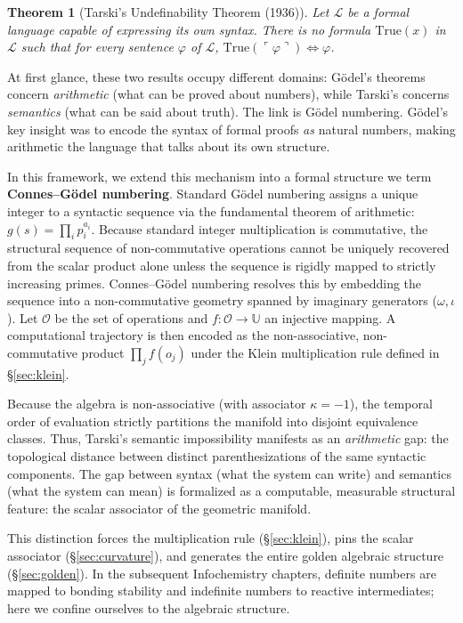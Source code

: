 \documentclass[12pt,oneside]{article}
\theoremstyle{principia}
\newtheorem{theorem}{Theorem}[section]
\theoremstyle{definition}
\theoremstyle{remark}
\providecommand{\UU}{\mathbb{U}}
\providecommand{\kap}{\kappa}
\begin{document}
\begin{theorem}[Tarski's Undefinability Theorem (1936)]\label{thm:tarski}
Let $\mathcal{L}$ be a formal language capable of expressing its own syntax. There is no formula $\mathrm{True}(x)$ in $\mathcal{L}$ such that for every sentence $\varphi$ of $\mathcal{L}$, $\mathrm{True}(\ulcorner \varphi \urcorner) \iff \varphi$.
\end{theorem}

At first glance, these two results occupy different domains: G\"odel's theorems concern \emph{arithmetic} (what can be proved about numbers), while Tarski's concerns \emph{semantics} (what can be said about truth). The link is G\"odel numbering. G\"odel's key insight was to encode the syntax of formal proofs \emph{as} natural numbers, making arithmetic the language that talks about its own structure. 

In this framework, we extend this mechanism into a formal structure we term \textbf{Connes--G\"odel numbering}. Standard G\"odel numbering assigns a unique integer to a syntactic sequence via the fundamental theorem of arithmetic: $g(s) = \prod_i p_i^{a_i}$. Because standard integer multiplication is commutative, the structural sequence of non-commutative operations cannot be uniquely recovered from the scalar product alone unless the sequence is rigidly mapped to strictly increasing primes. Connes--G\"odel numbering resolves this by embedding the sequence into a non-commutative geometry spanned by imaginary generators ($\omega, \iota$). Let $\mathcal{O}$ be the set of operations and $f: \mathcal{O} \to \UU$ an injective mapping. A computational trajectory is then encoded as the non-associative, non-commutative product $\prod_{j} f(o_j)$ under the Klein multiplication rule defined in \S\ref{sec:klein}. 

Because the algebra is non-associative (with associator $\kap = -1$), the temporal order of evaluation strictly partitions the manifold into disjoint equivalence classes. Thus, Tarski's semantic impossibility manifests as an \emph{arithmetic} gap: the topological distance between distinct parenthesizations of the same syntactic components. The gap between syntax (what the system can write) and semantics (what the system can mean) is formalized as a computable, measurable structural feature: the scalar associator of the geometric manifold.

\medskip

This distinction forces the multiplication rule (\S\ref{sec:klein}), pins the scalar associator (\S\ref{sec:curvature}), and generates the entire golden algebraic structure (\S\ref{sec:golden}). In the subsequent Infochemistry chapters, definite numbers are mapped to bonding stability and indefinite numbers to reactive intermediates; here we confine ourselves to the algebraic structure.
\end{document}
